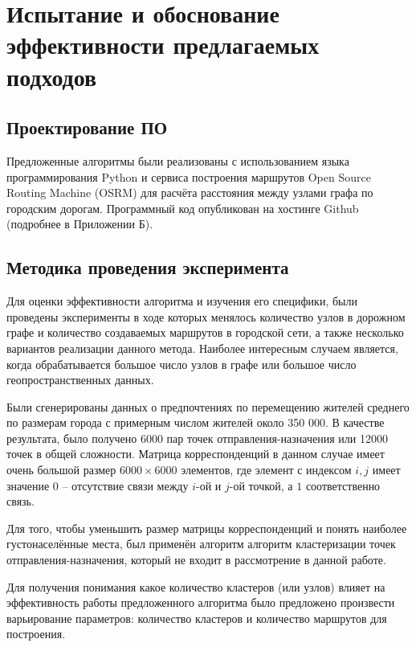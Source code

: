 \chapter{Испытание и обоснование эффективности предлагаемых подходов}
\section{Проектирование ПО}
Предложенные алгоритмы были реализованы с использованием языка программирования Python и сервиса построения 
маршрутов Open Source Routing Machine (OSRM) для расчёта расстояния между узлами графа по городским дорогам.
Программный код опубликован на хостинге Github (подробнее в Приложении Б).

\section{Методика проведения эксперимента}
Для оценки эффективности алгоритма и изучения его специфики, были проведены эксперименты в ходе которых 
менялось количество узлов в дорожном графе и количество создаваемых маршрутов в городской сети, а также 
несколько вариантов реализации данного метода. Наиболее интересным случаем является, когда обрабатывается 
большое число узлов в графе или большое число геопространственных данных.

Были сгенерированы данных о предпочтениях по перемещению жителей среднего по размерам города с примерным 
числом жителей около 350 000. В качестве результата, было получено 6000 пар точек отправления-назначения или 
12000 точек в общей сложности. Матрица корреспонденций в данном случае имеет очень большой размер 
\( 6000 \times 6000 \) элементов, где элемент с индексом \( i, j \) имеет значение \( 0 \) -- отсутствие связи 
между \( i \)-ой и \( j \)-ой точкой, а \( 1 \) соответственно связь.

Для того, чтобы уменьшить размер матрицы корреспонденций и понять наиболее густонаселённые места, был 
применён алгоритм алгоритм кластеризации точек отправления-назначения, который не входит в рассмотрение в 
данной работе.


Для получения понимания какое количество кластеров (или узлов) влияет на эффективность работы предложенного 
алгоритма было предложено произвести варьирование параметров: количество кластеров и количество маршрутов для 
построения.

